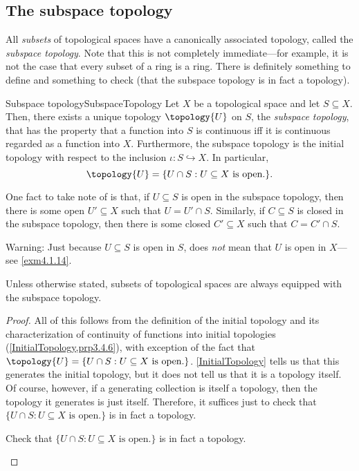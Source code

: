 \subsection{The subspace topology}

All \emph{subsets} of topological spaces have a canonically associated topology, called the \emph{subspace topology}.  Note that this is not completely immediate---for example, it is not the case that every subset of a ring is a ring.  There is definitely something to define and something to check (that the subspace topology is in fact a topology).
\begin{prp}{Subspace topology}{SubspaceTopology}
Let $X$ be a topological space and let $S\subseteq X$.  Then, there exists a unique topology $\topology{U}$ on $S$, the \emph{subspace topology}, that has the property that a function into $S$ is continuous iff it is continuous regarded as a function into $X$.  Furthermore, the subspace topology is the initial topology with respect to the inclusion $\iota :S\hookrightarrow X$.  In particular,
\begin{equation}
\topology{U}=\{ U\cap S:U\subseteq X\text{ is open.}\} .
\end{equation}
\begin{rmk}
One fact to take note of is that, if $U\subseteq S$ is open in the subspace topology, then there is some open $U'\subseteq X$ such that $U=U'\cap S$.  Similarly, if $C\subseteq S$ is closed in the subspace topology, then there is some closed $C'\subseteq X$ such that $C=C'\cap S$.
\end{rmk}
\begin{wrn}
Warning:  Just because $U\subseteq S$ is open in $S$, does \emph{not} mean that $U$ is open in $X$---see \cref{exm4.1.14}.
\end{wrn}
\begin{rmk}
Unless otherwise stated, subsets of topological spaces are always equipped with the subspace topology.
\end{rmk}
\begin{proof}
All of this follows from the definition of the initial topology and its characterization of continuity of functions into initial topologies (\cref{InitialTopology,prp3.4.6}), with exception of the fact that $\topology{U}=\{ U\cap S:U\subseteq X\text{ is open.}\}$.  \cref{InitialTopology} tells us that this generates the initial topology, but it does not tell us that it is a topology itself.  Of course, however, if a generating collection is itself a topology, then the topology it generates is just itself.  Therefore, it suffices just to check that $\{ U\cap S:U\subseteq X\text{ is open.}\}$ is in fact a topology.
\begin{exr}[breakable=false]{}{}
Check that $\{ U\cap S:U\subseteq X\text{ is open.}\}$ is in fact a topology.
\end{exr}
\end{proof}
\end{prp}
